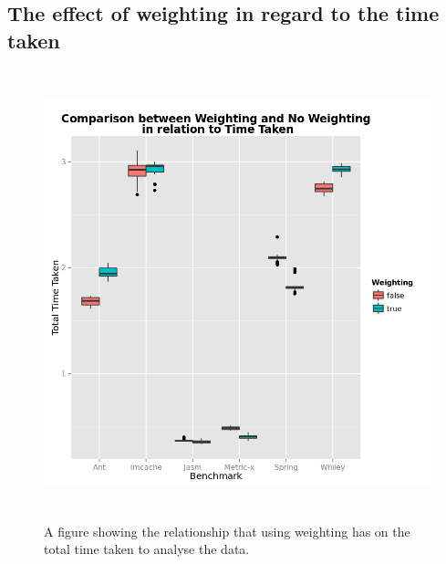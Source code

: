 \begin{appendices}
\chapter{The effect of weighting in regard to the time taken}
\begin{figure}[h]
\centering
\includegraphics[width=\textwidth,height=13cm]{WeightTime.png}
\caption{A figure showing the relationship that using weighting has on the total time taken to analyse the data.}
\label{fig:weighttime}
\end{figure}


\end{appendices}
